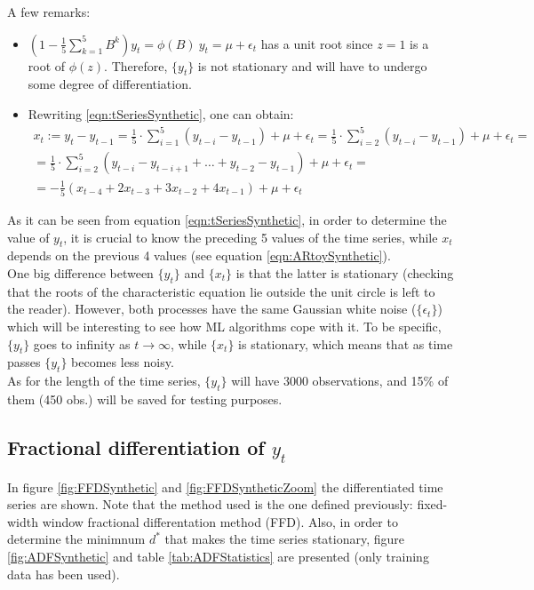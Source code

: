 \documentclass[a4paper]{report}
\begin{document}
A few remarks:
\begin{itemize}
	\item $\left( 1 - \frac{1}{5} \sum_{k = 1}^5 B^k \right) y_t = 
	\phi (B) \ y_t = \mu + \epsilon_t$ has a unit root since 
	$z = 1$ 	is a root of $\phi(z)$. Therefore, $\{ y_t \}$ is not stationary 
	and will have to undergo some degree of differentiation.
	
	\item Rewriting \ref{eqn:tSeriesSynthetic}, one can obtain:
	\begin{align}	
	x_t := y_t - y_{t-1} = \frac{1}{5} \cdot \sum_{i = 1}^{5} (y_{t-i} - 
	y_{t-1}) + \mu + \epsilon_t = \frac{1}{5} \cdot \sum_{i = 2}^{5} (y_{t-i} 
	- y_{t-1}) + \mu + \epsilon_t = \nonumber \\ 
	= \frac{1}{5} \cdot \sum_{i = 2}^{5} (y_{t-i} - 	y_{t-i+1} + \ldots + 
	y_{t-2} - y_{t-1}) + \mu + \epsilon_t = \nonumber \\
	= -\frac{1}{5} \left( 	x_{t-4}	+ 2 x_{t-3} + 3 x_{t-2} + 4 x_{t-1} 
	\right) 	+ \mu + \epsilon_t \label{eqn:ARtoySynthetic}
	\end{align}
\end{itemize}

As it can be seen from equation \ref{eqn:tSeriesSynthetic}, in order to 
determine the value of $y_t$, it is crucial to know the preceding 5 values 
of the time series, while $x_t$ depends on the previous 4 values (see 
equation \ref{eqn:ARtoySynthetic}).\\

One big difference between $\{ y_t \}$ and  $\{ x_t \}$ is that the latter is 
stationary (checking that the roots of the characteristic equation lie 
outside the unit circle is left to the reader). However, both processes have 
the same Gaussian white noise ($\{ \epsilon_t \}$) which will be interesting 
to see how ML algorithms cope with it. To be specific, $\{ y_t \}$ goes to 
infinity as $t \rightarrow \infty$, while $\{ x_t \}$ is stationary, which 
means that as time passes $\{ y_t \}$ becomes less noisy.\\

As for the length of the time series, $\{ y_t \}$ will have 3000 
observations, and 15\% of them (450 obs.) will be saved for testing purposes.

\subsection{Fractional differentiation of $y_t$}
In figure \ref{fig:FFDSynthetic} and \ref{fig:FFDSyntheticZoom} the 
differentiated time series are shown. Note that the method used is the one 
defined previously: fixed-width window fractional differentation method 
(FFD). Also, in order to determine the minimnum $d^*$ that makes the time 
series stationary, figure \ref{fig:ADFSynthetic} and table 
\ref{tab:ADFStatistics} are presented (only training data has been used).\\
\end{document}
